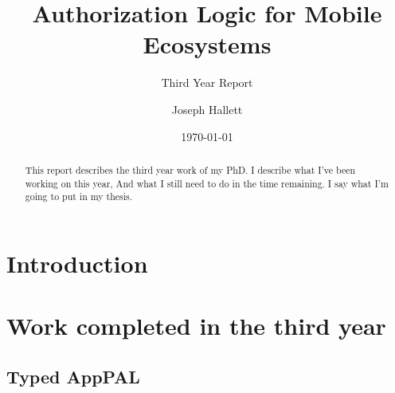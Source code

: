 \documentclass[a4paper]{scrartcl}
\title{Authorization Logic for Mobile Ecosystems}
\subtitle{Third Year Report}
\author{Joseph Hallett}
\date\today
\begin{document}
\maketitle

\begin{abstract}
  This report describes the third year work of my PhD.
  I describe what I've been working on this year,
  And what I still need to do in the time remaining.
  I say what I'm going to put in my thesis.
\end{abstract}

\section{Introduction}
\label{sec:introduction}

\section{Work completed in the third year}
\label{sec:work}

\subsection{Typed AppPAL}
\label{sec:types}
\end{document}
